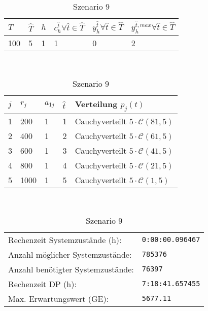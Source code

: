 \begin{table}[h!]
\renewcommand{\arraystretch}{1.5}
  \begin{center}
    \caption{Szenario 9}  \label{S9}
    \vspace*{3mm}
    \begin{tabular}{l l l l l l}   %
    $T$ & $\hat T$  & $h$ & $c_h^{\hat t}\forall \hat{t}\in{\hat T}$ & $y_h^{\hat t}\forall \hat{t}\in{\hat T}$  & $y_h^{{\hat t},max}\forall \hat{t}\in{\hat T}$  \\  \hline
100 & 5 & 1 & 1 & 0 & 2  \\ \hline
    \end{tabular} \\[3mm]
        \begin{tabular}{p{1cm} p{1cm} p{1cm}  p{1cm} p{6cm}}   %
    $j$ & $r_j$  & $a_{1j}$ & $\hat t$ & Verteilung $p_j(t)$ \\  \hline
1 & 200 & 1 & 1 & Cauchyverteilt $5\cdot\mathcal{C}(81, 5)$   \\
2 & 400 & 1 & 2 & Cauchyverteilt $5\cdot\mathcal{C}(61, 5)$  \\
3 & 600 & 1 & 3 & Cauchyverteilt $5\cdot\mathcal{C}(41, 5)$  \\
4 & 800 & 1 & 4 & Cauchyverteilt $5\cdot\mathcal{C}(21, 5)$  \\
5 & 1000 & 1 & 5 & Cauchyverteilt $5\cdot\mathcal{C}(1, 5)$ \\ \hline
    \end{tabular} \\[3mm]
     \begin{tabular}{p{7cm}p{5cm}} \hline
     Rechenzeit Systemzustände (h): & \texttt{0:00:00.096467} \\
     Anzahl möglicher Systemzustände: & \texttt{785376} \\
     Anzahl benötigter Systemzustände: & \texttt{76397} \\ 
     Rechenzeit DP (h): & \texttt{7:18:41.657455} \\ 
          Max. Erwartungswert (GE): & \texttt{5677.11} \\ \hline
         \end{tabular} \\[3mm]
  \end{center}
\end{table}


